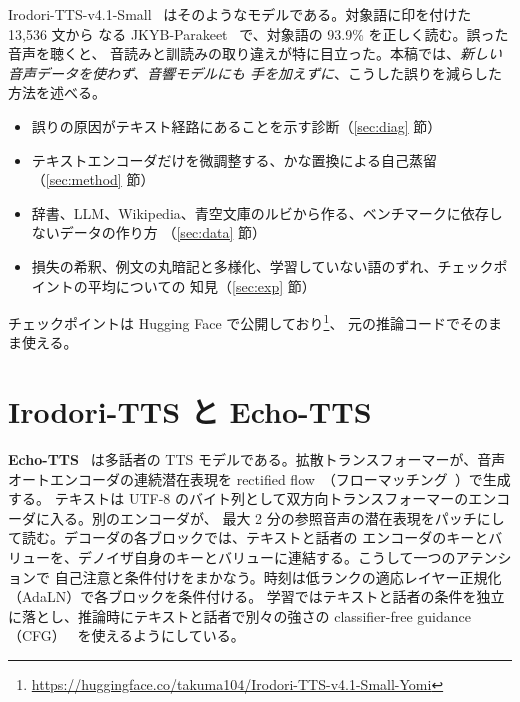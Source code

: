 \documentclass[10pt,a4paper,twocolumn]{article}
\begin{document}
Irodori-TTS-v4.1-Small~\cite{irodori} はそのようなモデルである。対象語に印を付けた 13,536 文から
なる JKYB-Parakeet~\cite{jkyb,jkybp} で、対象語の 93.9\% を正しく読む。誤った音声を聴くと、
音読みと訓読みの取り違えが特に目立った。本稿では、\emph{新しい音声データを使わず、音響モデルにも
手を加えずに}、こうした誤りを減らした方法を述べる。
\begin{itemize}
\item 誤りの原因がテキスト経路にあることを示す診断（\ref{sec:diag} 節）
\item テキストエンコーダだけを微調整する、かな置換による自己蒸留（\ref{sec:method} 節）
\item 辞書、LLM、Wikipedia、青空文庫のルビから作る、ベンチマークに依存しないデータの作り方
  （\ref{sec:data} 節）
\item 損失の希釈、例文の丸暗記と多様化、学習していない語のずれ、チェックポイントの平均についての
  知見（\ref{sec:exp} 節）
\end{itemize}
チェックポイントは Hugging Face で公開しており\footnote{\url{https://huggingface.co/takuma104/Irodori-TTS-v4.1-Small-Yomi}}、
元の推論コードでそのまま使える。

\section{Irodori-TTS と Echo-TTS}\label{sec:arch}
\textbf{Echo-TTS}~\cite{echo} は多話者の TTS モデルである。拡散トランスフォーマーが、音声
オートエンコーダの連続潜在表現を rectified flow~\cite{rf}（フローマッチング~\cite{fm}）で生成する。
テキストは UTF-8 のバイト列として双方向トランスフォーマーのエンコーダに入る。別のエンコーダが、
最大 2 分の参照音声の潜在表現をパッチにして読む。デコーダの各ブロックでは、テキストと話者の
エンコーダのキーとバリューを、デノイザ自身のキーとバリューに連結する。こうして一つのアテンションで
自己注意と条件付けをまかなう。時刻は低ランクの適応レイヤー正規化（AdaLN）で各ブロックを条件付ける。
学習ではテキストと話者の条件を独立に落とし、推論時にテキストと話者で別々の強さの classifier-free
guidance（CFG）~\cite{cfg} を使えるようにしている。
\end{document}
